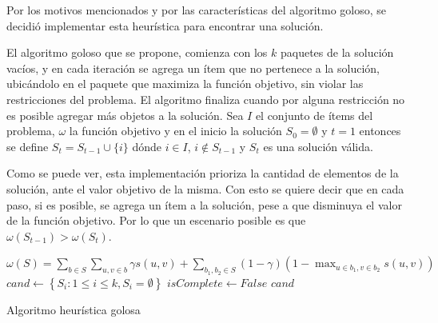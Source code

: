 Por los motivos mencionados y por las características del algoritmo goloso, se decidió implementar esta heurística para encontrar una solución. 

El algoritmo goloso que se propone, comienza con los $k$ paquetes de la solución vacíos, y en cada iteración se agrega un ítem que no pertenece a la solución, ubicándolo en el paquete que maximiza la función objetivo, sin violar las restricciones del problema. El algoritmo finaliza cuando por alguna restricción no es posible agregar más objetos a la solución. Sea $I$ el conjunto de ítems del problema, $\omega$ la función objetivo y en el inicio la solución $S_0 = \emptyset$ y $t=1$ entonces se define $S_t = S_{t-1} \cup \{i\}$ dónde $i \in I$, $i \notin S_{t-1}$ y $S_t$ es una solución válida. 

Como se puede ver, esta implementación prioriza la cantidad de elementos de la solución, ante el valor objetivo de la misma. Con esto se quiere decir que en cada paso, si es posible, se agrega un ítem a la solución, pese a que disminuya el valor de la función objetivo. Por lo que un escenario posible es que $\omega(S_{t-1}) > \omega(S_t)$.

\begin{center}
	\begin{algorithm}[H]
	\DontPrintSemicolon
	\SetAlgoLined
		$\omega(S) = \sum_{b \in S}{\sum_{u,v \in b}{\gamma s(u,v)}} + \sum_{b_1,b_2 \in S}{(1-\gamma) (1-\max_{u \in b_1, v \in b_2}{s(u,v)})}$\;
		$cand \leftarrow \left\{S_i: 1 \leq i \leq k, S_i = \emptyset\right\}$\;
		$isComplete \leftarrow False$\;
		\Return $cand$\;
	\caption{Algoritmo heurística golosa}\label{alg:algHeuGol}
	\end{algorithm}
\end{center}

